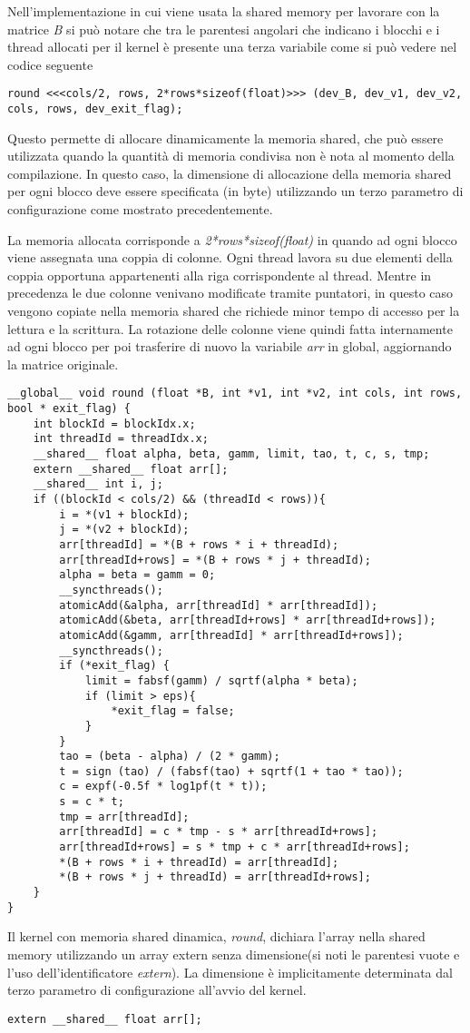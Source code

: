 \label{sec:Shared}
Nell'implementazione in cui viene usata la shared memory per lavorare con la matrice \textit{B} si può notare che tra le parentesi angolari che indicano i blocchi e i thread allocati per il kernel è presente una terza variabile come si può vedere nel codice seguente
\begin{lstlisting}
round <<<cols/2, rows, 2*rows*sizeof(float)>>> (dev_B, dev_v1, dev_v2, cols, rows, dev_exit_flag);
\end{lstlisting}
Questo permette di allocare dinamicamente la memoria shared, che può essere utilizzata quando la quantità di memoria condivisa non è nota al momento della compilazione. In questo caso, la dimensione di allocazione della memoria shared per ogni blocco deve essere specificata (in byte) utilizzando un terzo parametro di configurazione come mostrato precedentemente.

La memoria allocata corrisponde a \textit{2*rows*sizeof(float)} in quando ad ogni blocco viene assegnata una coppia di colonne. Ogni thread lavora su due elementi della coppia opportuna appartenenti alla riga corrispondente al thread.
Mentre in precedenza le due colonne venivano modificate tramite puntatori, in questo caso vengono copiate nella memoria shared che richiede minor tempo di accesso per la lettura e la scrittura. La rotazione delle colonne viene quindi fatta internamente ad ogni blocco per poi trasferire di nuovo la variabile \textit{arr} in global, aggiornando la matrice originale.
\begin{lstlisting}
__global__ void round (float *B, int *v1, int *v2, int cols, int rows, bool * exit_flag) {
	int blockId = blockIdx.x;
	int threadId = threadIdx.x;
	__shared__ float alpha, beta, gamm, limit, tao, t, c, s, tmp;
	extern __shared__ float arr[];
	__shared__ int i, j;
	if ((blockId < cols/2) && (threadId < rows)){
		i = *(v1 + blockId);
		j = *(v2 + blockId);
		arr[threadId] = *(B + rows * i + threadId);
		arr[threadId+rows] = *(B + rows * j + threadId);
		alpha = beta = gamm = 0;
		__syncthreads();
		atomicAdd(&alpha, arr[threadId] * arr[threadId]);
		atomicAdd(&beta, arr[threadId+rows] * arr[threadId+rows]);	
		atomicAdd(&gamm, arr[threadId] * arr[threadId+rows]);
		__syncthreads();
		if (*exit_flag) {
			limit = fabsf(gamm) / sqrtf(alpha * beta);
			if (limit > eps){
				*exit_flag = false;
			}
		}
		tao = (beta - alpha) / (2 * gamm);
		t = sign (tao) / (fabsf(tao) + sqrtf(1 + tao * tao)); 
		c = expf(-0.5f * log1pf(t * t));
		s = c * t;
		tmp = arr[threadId];
		arr[threadId] = c * tmp - s * arr[threadId+rows];
		arr[threadId+rows] = s * tmp + c * arr[threadId+rows];
		*(B + rows * i + threadId) = arr[threadId];
		*(B + rows * j + threadId) = arr[threadId+rows];
	}
}
\end{lstlisting}
Il kernel con memoria shared dinamica, \textit{round}, dichiara l'array nella shared memory utilizzando un array extern senza dimensione(si noti le parentesi vuote e l'uso dell'identificatore \textit{extern}). La dimensione è implicitamente determinata dal terzo parametro di configurazione all'avvio del kernel.
\begin{lstlisting}
extern __shared__ float arr[];
\end{lstlisting}